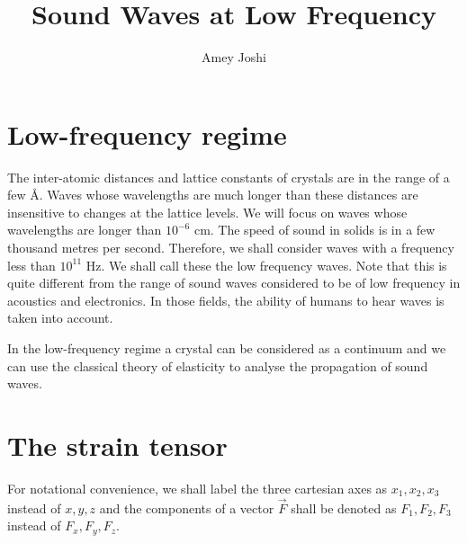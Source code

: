 \documentclass{article}
\title{Sound Waves at Low Frequency}
\begin{document}
\author{Amey Joshi}
\maketitle
\section{Low-frequency regime}\label{s1}
The inter-atomic distances and lattice constants of crystals are in the range
of a few \AA. Waves whose wavelengths are much longer than these distances are
insensitive to changes at the lattice levels. We will focus on waves whose 
wavelengths are longer than $10^{-6}$ cm. The speed of sound in solids is in a
few thousand metres per second. Therefore, we shall consider waves with a 
frequency less than $10^{11}$ Hz. We shall call these the low frequency waves.
Note that this is quite different from the range of sound waves considered to be
of low frequency in acoustics and electronics. In those fields, the ability of
humans to hear waves is taken into account.

In the low-frequency regime a crystal can be considered as a continuum and we
can use the classical theory of elasticity to analyse the propagation of sound
waves.

\section{The strain tensor}\label{s2}
For notational convenience, we shall label the three cartesian axes as $x_1, 
x_2, x_3$ instead of $x, y, z$ and the components of a vector $\vec{F}$ shall
be denoted as $F_1, F_2, F_3$ instead of $F_x, F_y, F_z$.
\end{document}

